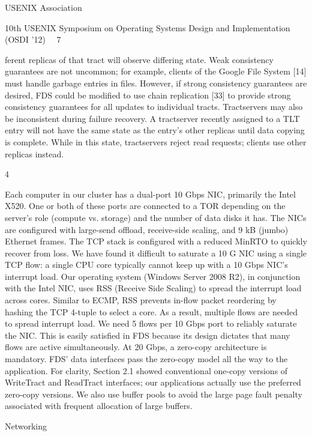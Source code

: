 USENIX Association  

10th USENIX Symposium on Operating Systems Design and Implementation (OSDI ’12)  7


ferent replicas of that tract will observe differing state.
Weak consistency guarantees are not uncommon; for example, clients of the Google File System [14] must handle garbage entries in files. However, if strong consistency guarantees are desired, FDS could be modified to
use chain replication [33] to provide strong consistency
guarantees for all updates to individual tracts.
Tractservers may also be inconsistent during failure
recovery. A tractserver recently assigned to a TLT entry will not have the same state as the entry’s other replicas until data copying is complete. While in this state,
tractservers reject read requests; clients use other replicas instead.

4

Each computer in our cluster has a dual-port 10 Gbps
NIC, primarily the Intel X520. One or both of these ports
are connected to a TOR depending on the server’s role
(compute vs. storage) and the number of data disks it
has. The NICs are configured with large-send offload,
receive-side scaling, and 9 kB (jumbo) Ethernet frames.
The TCP stack is configured with a reduced MinRTO to
quickly recover from loss.
We have found it difficult to saturate a 10 G NIC using
a single TCP flow: a single CPU core typically cannot
keep up with a 10 Gbps NIC’s interrupt load. Our operating system (Windows Server 2008 R2), in conjunction
with the Intel NIC, uses RSS (Receive Side Scaling) to
spread the interrupt load across cores. Similar to ECMP,
RSS prevents in-flow packet reordering by hashing the
TCP 4-tuple to select a core. As a result, multiple flows
are needed to spread interrupt load. We need 5 flows
per 10 Gbps port to reliably saturate the NIC. This is easily satisfied in FDS because its design dictates that many
flows are active simultaneously.
At 20 Gbps, a zero-copy architecture is mandatory.
FDS’ data interfaces pass the zero-copy model all the
way to the application. For clarity, Section 2.1 showed
conventional one-copy versions of WriteTract and
ReadTract interfaces; our applications actually use the
preferred zero-copy versions. We also use buffer pools
to avoid the large page fault penalty associated with frequent allocation of large buffers.

Networking

